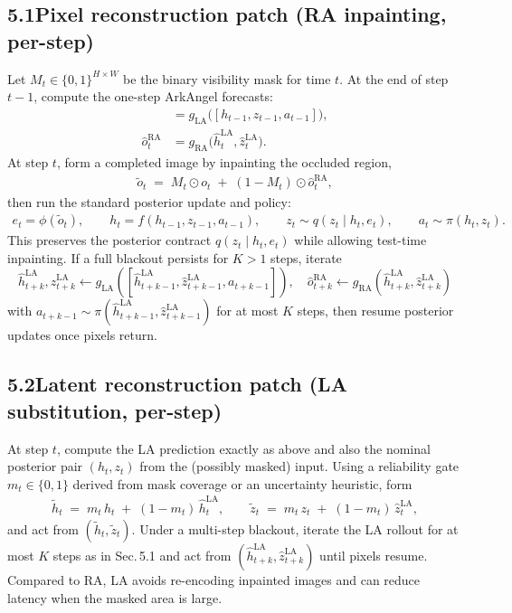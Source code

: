 \documentclass[11pt]{article}
\begin{document}
\subsection*{5.1\quad Pixel reconstruction patch (RA inpainting, per-step)}
Let $M_t\in\{0,1\}^{H\times W}$ be the binary visibility mask for time $t$. At the end of step $t{-}1$, compute the one-step ArkAngel forecasts:
\begin{align}
[\hat h_{t}^{\mathrm{LA}},\hat z_{t}^{\mathrm{LA}}] &= g_{\mathrm{LA}}\big([h_{t-1},z_{t-1},a_{t-1}]\big), \\
\hat o_{t}^{\mathrm{RA}} &= g_{\mathrm{RA}}\big(\hat h_{t}^{\mathrm{LA}},\hat z_{t}^{\mathrm{LA}}\big).
\end{align}
At step $t$, form a completed image by inpainting the occluded region,
\begin{align}
\tilde o_t \;=\; M_t \odot o_t \;+\; (1-M_t)\odot \hat o_{t}^{\mathrm{RA}},
\end{align}
then run the standard posterior update and policy:
\begin{align}
e_t=\phi(\tilde o_t),\qquad h_t=f(h_{t-1},z_{t-1},a_{t-1}),\qquad z_t\sim q(z_t\mid h_t,e_t),\qquad a_t\sim\pi(h_t,z_t).
\end{align}
This preserves the posterior contract $q(z_t\mid h_t,e_t)$ while allowing test-time inpainting. If a full blackout persists for $K>1$ steps, iterate
\[
\hat h_{t+k}^{\mathrm{LA}},\hat z_{t+k}^{\mathrm{LA}} \leftarrow g_{\mathrm{LA}}([\hat h_{t+k-1}^{\mathrm{LA}},\hat z_{t+k-1}^{\mathrm{LA}}, a_{t+k-1}]),
\quad
\hat o_{t+k}^{\mathrm{RA}} \leftarrow g_{\mathrm{RA}}(\hat h_{t+k}^{\mathrm{LA}},\hat z_{t+k}^{\mathrm{LA}})
\]
with $a_{t+k-1}\sim\pi(\hat h_{t+k-1}^{\mathrm{LA}},\hat z_{t+k-1}^{\mathrm{LA}})$ for at most $K$ steps, then resume posterior updates once pixels return.

\subsection*{5.2\quad Latent reconstruction patch (LA substitution, per-step)}
At step $t$, compute the LA prediction exactly as above and also the nominal posterior pair $(h_t,z_t)$ from the (possibly masked) input. Using a reliability gate $m_t\in\{0,1\}$ derived from mask coverage or an uncertainty heuristic, form
\begin{align}
\tilde h_t \;=\; m_t\,h_t \;+\; (1-m_t)\,\hat h_{t}^{\mathrm{LA}}, \qquad
\tilde z_t \;=\; m_t\,z_t \;+\; (1-m_t)\,\hat z_{t}^{\mathrm{LA}},
\end{align}
and act from $(\tilde h_t,\tilde z_t)$. Under a multi-step blackout, iterate the LA rollout for at most $K$ steps as in Sec.\,5.1 and act from $(\hat h_{t+k}^{\mathrm{LA}},\hat z_{t+k}^{\mathrm{LA}})$ until pixels resume. Compared to RA, LA avoids re-encoding inpainted images and can reduce latency when the masked area is large.
\end{document}
